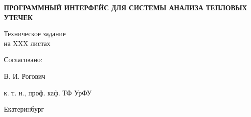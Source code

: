 \begin{titlepage}
\begin{center}
	\par \vspace{1cm}
	\begin{Large}
		\textbf{ПРОГРАММНЫЙ ИНТЕРФЕЙС ДЛЯ СИСТЕМЫ АНАЛИЗА ТЕПЛОВЫХ УТЕЧЕК}
	\end{Large}

	\begin{center}	
			Техническое задание \\
			на XXX листах
	\end{center}

	\begin{raggedright}

		Согласовано:

		\underline{\hspace{3cm}} В. И. Рогович

		к. т. н., проф. каф. ТФ УрФУ

	\end{raggedright}


	\par
	\vspace{4cm}

	\noindent Екатеринбург\\
	\\
\end{center}
\end{titlepage}
